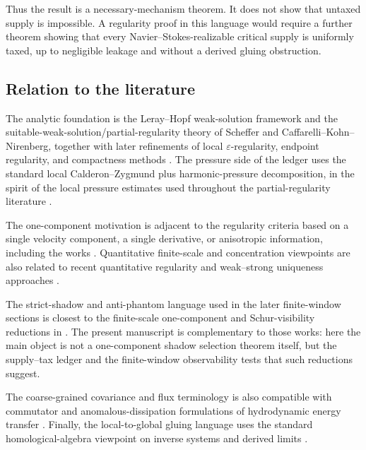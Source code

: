\documentclass[11pt]{article}
\numberwithin{equation}{section}
\newcommand{\eps}{\varepsilon}
\begin{document}
Thus the result is a necessary-mechanism theorem.  It does not show that
untaxed supply is impossible.  A regularity proof in this language would
require a further theorem showing that every Navier--Stokes-realizable
critical supply is uniformly taxed, up to negligible leakage and without a
derived gluing obstruction.


\subsection{Relation to the literature}

The analytic foundation is the Leray--Hopf weak-solution framework and the
suitable-weak-solution/partial-regularity theory of Scheffer and
Caffarelli--Kohn--Nirenberg, together with later refinements of local
\(\eps\)-regularity, endpoint regularity, and compactness methods \cite{Leray1934,Hopf1951,Scheffer1976,Scheffer1977,CKN1982,Lin1998,ESS2003,Vasseur2007,SereginLectureNotes}.  The pressure side of the ledger uses the standard local Calderon--Zygmund plus harmonic-pressure decomposition, in the spirit of the local pressure estimates used throughout the partial-regularity literature \cite{SohrWahl1986,SereginSverak2002,Wolf2017,SereginLectureNotes}.

The one-component motivation is adjacent to the regularity criteria based on a single velocity component, a single derivative, or anisotropic information, including the works \cite{KukavicaZiane2006,KukavicaZiane2007,ZhouPokorny2009,ZhouPokorny2010,CaoTiti2011,CheminZhang2016,CheminZhangZhang2017,KukavicaRusinZiane2017,HanLeiLiZhao2019,KangNguyen2023}.  Quantitative finite-scale and concentration viewpoints are also related to recent quantitative regularity and weak--strong uniqueness approaches \cite{BarkerPrange2021,AlbrittonBarkerPrange2023}.

The strict-shadow and anti-phantom language used in the later finite-window sections is closest to the finite-scale one-component and Schur-visibility reductions in \cite{Yu2026HarmonicPressure,Yu2026StrictShadows,Yu2026SchurVisibility}.  The present manuscript is complementary to those works: here the main object is not a one-component shadow selection theorem itself, but the supply--tax ledger and the finite-window observability tests that such reductions suggest.

The coarse-grained covariance and flux terminology is also compatible with commutator and anomalous-dissipation formulations of hydrodynamic energy transfer \cite{ConstantinETiti1994,Eyink1994,DuchonRobert2000,LeslieShvydkoy2018}.  Finally, the local-to-global gluing language uses the standard homological-algebra viewpoint on inverse systems and derived limits \cite{MacLane1963,Weibel1994}.
\end{document}
